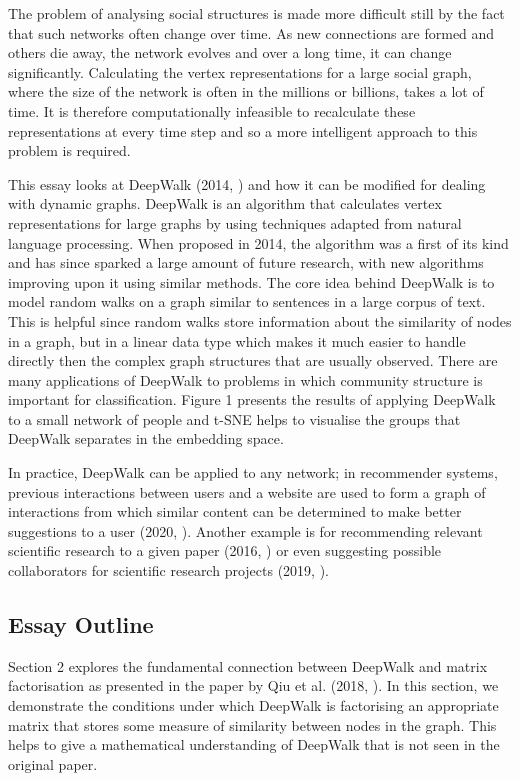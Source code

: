 \documentclass[a4paper]{article}
\begin{document}
The problem of analysing social structures is made more difficult still by the
fact that such networks often change over time. As new connections are formed
and others die away, the network evolves and over a long time, it can
change significantly. Calculating the vertex representations for a large social
graph, where the size of the network is often in the millions or billions, takes
a lot of time. It is therefore computationally infeasible to recalculate these
representations at every time step and so a more intelligent approach to this
problem is required.

This essay looks at DeepWalk (2014, \cite{deepwalk}) and how it can be modified for dealing with dynamic
graphs. DeepWalk is an algorithm that calculates vertex representations for
large graphs by using techniques adapted from natural language processing. When proposed in 2014,
 the algorithm was a first of its kind and has since sparked a large amount of future research, with new
algorithms improving upon it using similar methods. The core idea behind DeepWalk is to model random walks
on a graph similar to sentences in a large corpus of text. This is helpful since random walks store information
about the similarity of nodes in a graph, but in a linear data type which makes it much easier to handle directly then the
complex graph structures that are usually observed. There are many applications of DeepWalk to problems in which community structure is important for classification. Figure 1 presents the results of applying DeepWalk to a small network of people and t-SNE helps to visualise the groups that DeepWalk separates in the embedding space.

In practice, DeepWalk can be applied to any network; in recommender systems, previous interactions between users and a website are used to form a graph of interactions from which similar content can be determined to make better
suggestions to a user (2020, \cite{bai2020}). Another example is for recommending relevant scientific research to a given paper (2016, \cite{zhao2016}) or even suggesting possible collaborators for scientific research projects (2019, \cite{xu2019}).


\subsection{Essay Outline}
Section 2 explores the fundamental connection between DeepWalk and
matrix factorisation as presented in the paper by Qiu et al. (2018, \cite{qiu2018}). In
this section, we demonstrate the conditions under which DeepWalk is factorising
an appropriate matrix that stores some measure of similarity between
nodes in the graph. This helps to give a mathematical understanding of DeepWalk that is not seen in the original paper.
\end{document}

